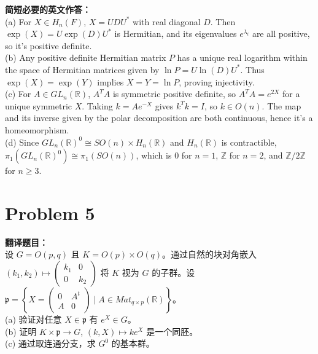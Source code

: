 \documentclass{ctexart}
\begin{document}
\vspace{1em}
\textbf{简短必要的英文作答：}\\
(a) For $X \in H_n(F)$, $X = UDU^*$ with real diagonal $D$. Then $\exp(X) = U \exp(D) U^*$ is Hermitian, and its eigenvalues $e^{\lambda_i}$ are all positive, so it's positive definite.\\
(b) Any positive definite Hermitian matrix $P$ has a unique real logarithm within the space of Hermitian matrices given by $\ln P = U \ln(D) U^*$. Thus $\exp(X) = \exp(Y)$ implies $X=Y=\ln P$, proving injectivity.\\
(c) For $A \in GL_n(\mathbb{R})$, $A^TA$ is symmetric positive definite, so $A^TA = e^{2X}$ for a unique symmetric $X$. Taking $k = Ae^{-X}$ gives $k^Tk = I$, so $k \in O(n)$. The map and its inverse given by the polar decomposition are both continuous, hence it's a homeomorphism.\\
(d) Since $GL_n(\mathbb{R})^0 \cong SO(n) \times H_n(\mathbb{R})$ and $H_n(\mathbb{R})$ is contractible, $\pi_1(GL_n(\mathbb{R})^0) \cong \pi_1(SO(n))$, which is $0$ for $n=1$, $\mathbb{Z}$ for $n=2$, and $\mathbb{Z}/2\mathbb{Z}$ for $n \ge 3$.

\vspace{2em}
\section*{Problem 5}
\textbf{翻译题目：}\\
设 $G = O(p, q)$ 且 $K = O(p) \times O(q)$。通过自然的块对角嵌入 $(k_1, k_2) \mapsto \begin{pmatrix} k_1 & 0 \\ 0 & k_2 \end{pmatrix}$ 将 $K$ 视为 $G$ 的子群。设 $\mathfrak{p} = \left\{ X = \begin{pmatrix} 0 & A^t \\ A & 0 \end{pmatrix} \mid A \in Mat_{q \times p}(\mathbb{R}) \right\}$。\\
(a) 验证对任意 $X \in \mathfrak{p}$ 有 $e^X \in G$。\\
(b) 证明 $K \times \mathfrak{p} \to G$, $(k, X) \mapsto ke^X$ 是一个同胚。\\
(c) 通过取连通分支，求 $G^0$ 的基本群。
\end{document}
